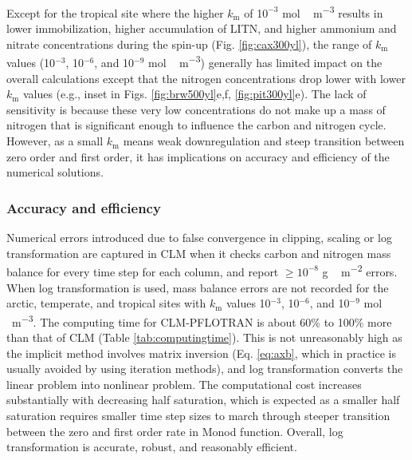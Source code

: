 \documentclass[gmd, manuscript]{copernicus}
\begin{document}
Except for the tropical site where the higher $k_\text{m}$ of 1$0^{-3}$
\unit{mol\,m^{-3}} results in lower immobilization, higher accumulation of
LITN, and higher ammonium and nitrate concentrations during the spin-up (Fig.
\ref{fig:cax300yl}), the range of $k_\text{m}$ values (10$^{-3}$, 10$^{-6}$,
and 10$^{-9}$ \unit{mol\,m^{-3}}) generally has limited impact on the overall
calculations except that the nitrogen concentrations drop lower with lower
$k_\text{m}$ values (e.g., inset in Figs. \ref{fig:brw500yl}e,f,
\ref{fig:pit300yl}e). The lack of
sensitivity is because these very low concentrations do not make up a mass of
nitrogen that is significant enough to influence the carbon and nitrogen cycle.
However, as a small $k_\text{m}$ means weak downregulation and steep transition
between zero order and first order, it has implications on accuracy
and efficiency of the numerical solutions.

\subsubsection{Accuracy and efficiency}
Numerical errors introduced due to false convergence in clipping, scaling or
log transformation are captured in CLM when it checks carbon and nitrogen mass
balance for every time step for each column, and report  $\geq 10^{-8}$
\unit{g\,m^{-2}} errors.  When log transformation is used, 
mass balance errors are not recorded for the arctic, temperate, and tropical
sites with $k_\text{m}$ values 
10$^{-3}$, 10$^{-6}$, and 10$^{-9}$ \unit{mol\,m^{-3}}. The computing time for
CLM-PFLOTRAN is about 60\% to 100\% more than that of CLM (Table
\ref{tab:computingtime}). This is not unreasonably high as the implicit
method involves matrix inversion (Eq. \ref{eq:axb}, which in practice is
usually avoided by using iteration methods), and log transformation converts
the linear
problem into nonlinear problem. The computational cost increases substantially with
decreasing half saturation, which is expected as a smaller half saturation
requires smaller time step sizes to march through steeper transition between
the zero and first order rate in Monod function. Overall, log transformation is
accurate, robust, and reasonably efficient.  
\end{document}
